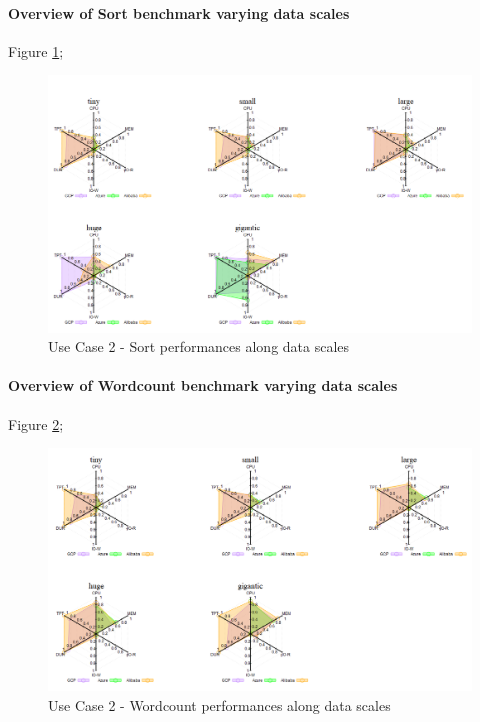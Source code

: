 \documentclass[review]{elsarticle}
\begin{document}
\paragraph{Overview of Sort benchmark varying data scales} Figure \ref{fig:uc2-srt}; 

\begin{figure}[p]
	\includegraphics[width=\textwidth]{uc2-srt}
	\caption{Use Case 2 - Sort performances along data scales}
	\label{fig:uc2-srt}
	\centering
\end{figure}

\paragraph{Overview of Wordcount benchmark varying data scales} Figure \ref{fig:uc2-wrdcnt}; 

\begin{figure}[p]
	\includegraphics[width=\textwidth]{uc2-wrdcnt}
	\caption{Use Case 2 - Wordcount performances along data scales}
	\label{fig:uc2-wrdcnt}
	\centering
\end{figure}
\end{document}

